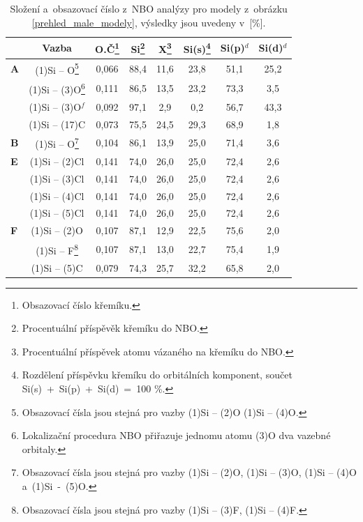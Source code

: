 \documentclass[
digital, %
table,   %
nolof,     %
nolot,     %
oneside,
]{fithesis3}
\begin{document}
\begin{table}[H]
\begin{minipage}{\textwidth}
\caption{Složení a~obsazovací číslo z~NBO analýzy pro modely z~obrázku \ref{prehled_male_modely}, výsledky jsou uvedeny v~[\%].}
\begin{center}
\begin{tabular}{|l|c|c|c|c|c|c|c|}
\hline
\label{nbo_small} &  Vazba & O.Č\footnote{Obsazovací číslo křemíku.} & Si\footnote{Procentuální příspěvěk křemíku do NBO.} & X\footnote{Procentuální příspěvek atomu vázaného na křemíku do NBO.} & Si(s)\footnote{Rozdělení příspěvku křemíku do orbitálních komponent, součet Si(s)~+~Si(p)~+~Si(d)~=~100 \%.} & Si(p)$^d$ &Si(d)$^d$ \\ \hline
\textbf{A} & (1)Si -- O\footnote{ Obsazovací čísla jsou stejná pro vazby (1)Si -- (2)O (1)Si -- (4)O.}  & 0,066 & 88,4  & 11,6  & 23,8  & 51,1  & 25,2  \\ \hline
&  (1)Si -- (3)O\footnote{Lokalizační procedura NBO přiřazuje jednomu atomu (3)O dva vazebné orbitaly.} & 0,111 & 86,5  & 13,5  & 23,2  & 73,3  & 3,5  \\ \hline
&  (1)Si -- (3)O$^f$ & 0,092 & 97,1  & 2,9  & 0,2  & 56,7  & 43,3  \\ \hline
& (1)Si -- (17)C & 0,073 & 75,5  & 24,5  & 29,3  & 68,9  & 1,8  \\ \hline
\textbf{B} & (1)Si -- O\footnote{Obsazovací čísla jsou stejná pro vazby (1)Si -- (2)O, (1)Si -- (3)O, (1)Si -- (4)O a~(1)Si~-~(5)O.}  & 0,104 & 86,1  & 13,9  & 25,0  & 71,4  & 3,6  \\ \hline
\textbf{E} & (1)Si -- (2)Cl & 0,141 & 74,0  & 26,0  & 25,0  & 72,4  & 2,6  \\ \hline
&  (1)Si -- (3)Cl& 0,141 & 74,0  & 26,0  & 25,0  & 72,4  & 2,6  \\ \hline
& (1)Si -- (4)Cl & 0,141 & 74,0  & 26,0  & 25,0  & 72,4  & 2,6  \\ \hline
&  (1)Si -- (5)Cl & 0,141 & 74,0  & 26,0  & 25,0  & 72,4  & 2,6  \\ \hline
\textbf{F}  & (1)Si -- (2)O &0,107 & 87,1  & 12,9  & 22,5  & 75,6  & 2,0  \\ \hline
& (1)Si -- F\footnote{ Obsazovací čísla jsou stejná pro vazby (1)Si -- (3)F, (1)Si -- (4)F.} & 0,107 & 87,1  & 13,0  & 22,7  & 75,4  & 1,9  \\ \hline
& (1)Si -- (5)C &0,079 & 74,3  & 25,7  & 32,2  & 65,8  & 2,0  \\ \hline
\end{tabular}
\end{center}
\end{minipage}
\end{table}
\end{document}
